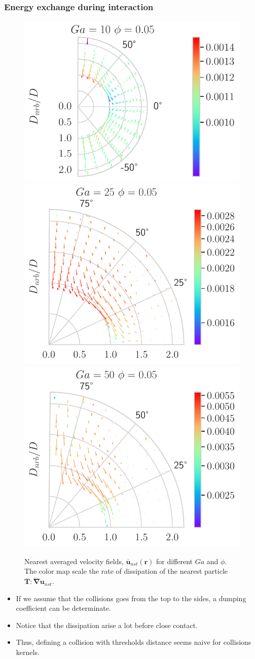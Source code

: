 \documentclass{sintefbeamer}
\newcommand{\nstavg}[1]{\overline{#1}_{nst}}
\newcommand{\nablab}{\bm{\nabla}}
\begin{document}
\begin{frame}
  \frametitle{Energy exchange during interaction}

  \begin{figure}
    
    \includegraphics[height=0.2\textwidth]{image/Dim_3/fDrop/Dmin_Theta_ed_nbr_Ga_10_PHI_0_05.pdf}
    \includegraphics[height=0.2\textwidth]{image/Dim_3/fDrop/Dmin_Theta_ed_nbr_Ga_25_PHI_0_05.pdf}
    \includegraphics[height=0.2\textwidth]{image/Dim_3/fDrop/Dmin_Theta_ed_nbr_Ga_50_PHI_0_05.pdf}

    
    \caption{Nearest averaged velocity fields, $\nstavg{\textbf{u}}(\textbf{r})$ for different $Ga$ and $\phi$. 
    The color map scale the rate of dissipation of the nearest particle $\nstavg{\textbf{T}:\nablab\textbf{u}}$.}
  \end{figure}

\begin{itemize}
  \item If we assume that the collisions goes from the top to the sides, a dumping coefficient can be determinate. 
  \item Notice that the dissipation arise a lot before close contact.
  \item Thus, defining a collision with thresholds distance seems naive for collisions kernels.   
\end{itemize}
\end{frame}
\end{document}
